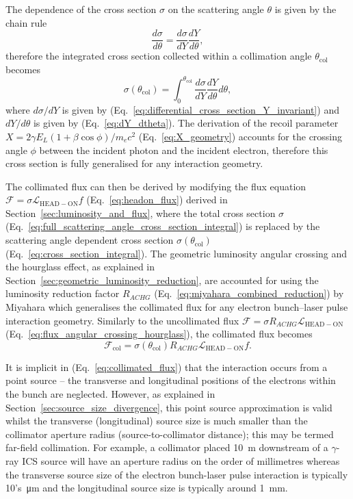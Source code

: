 \documentclass[../main.tex]{subfiles}
\begin{document}
The dependence of the cross section $\sigma$ on the scattering angle $\theta$ is given by the chain rule
\begin{equation}
\frac{d\sigma}{d\theta} = \frac{d\sigma}{dY}\frac{dY}{d\theta},
\label{eq:cross_section_chain_rule}
\end{equation}
therefore the integrated cross section collected within a collimation angle $\theta_{\mathrm{col}}$ becomes
\begin{equation}
\sigma\left(\theta_{\mathrm{col}}\right) = \int_{0}^{\theta_{\mathrm{col}}}\frac{d\sigma}{dY}\frac{dY}{d\theta}d\theta,
\label{eq:cross_section_integral}
\end{equation} 
where $d\sigma/dY$ is given by (Eq.~\ref{eq:differential_cross_section_Y_invariant}) and $dY/d\theta$ is given by (Eq.~\ref{eq:dY_dtheta}). The derivation of the recoil parameter $X = 2\gamma E_{L}\left(1+\beta\cos\phi\right)/m_{e}c^{2}$ (Eq.~\ref{eq:X_geometry}) accounts for the crossing angle $\phi$ between the incident photon and the incident electron, therefore this cross section is fully generalised for any interaction geometry.

The collimated flux can then be derived by modifying the flux equation $\mathcal{F} = \sigma\mathcal{L}_{\mathrm{HEAD-ON}}f$ (Eq.~\ref{eq:headon_flux}) derived in Section~\ref{sec:luminosity_and_flux}, where the total cross section $\sigma$ (Eq.~\ref{eq:full_scattering_angle_cross_section_integral}) is replaced by the scattering angle dependent cross section $\sigma\left(\theta_{\mathrm{col}}\right)$ (Eq.~\ref{eq:cross_section_integral}). The geometric luminosity angular crossing and the hourglass effect, as explained in Section~\ref{sec:geometric_luminosity_reduction}, are accounted for using the luminosity reduction factor $R_{ACHG}$ (Eq.~\ref{eq:miyahara_combined_reduction}) by Miyahara \cite{miyahara2008luminosity} which generalises the collimated flux for any electron bunch--laser pulse interaction geometry. Similarly to  the uncollimated flux $\mathcal{F} = \sigma R_{ACHG}\mathcal{L}_{\mathrm{HEAD-ON}}$ (Eq.~\ref{eq:flux_angular_crossing_hourglass}), the collimated flux becomes
\begin{equation}
\mathcal{F}_{\mathrm{col}} = \sigma\left(\theta_{\mathrm{col}}\right) R_{ACHG}\mathcal{L}_{\mathrm{HEAD-ON}}f.
\label{eq:collimated_flux}
\end{equation}

It is implicit in (Eq.~\ref{eq:collimated_flux}) that the interaction occurs from a point source -- the transverse and longitudinal positions of the electrons within the bunch are neglected. However, as explained in Section~\ref{sec:source_size_divergence}, this point source approximation is valid whilst the transverse (longitudinal) source size is much smaller than the collimator aperture radius (source-to-collimator distance); this may be termed far-field collimation. For example, a collimator placed 10~\si{\meter} downstream of a $\gamma$-ray ICS source will have an aperture radius on the order of millimetres whereas the transverse source size of the electron bunch-laser pulse interaction is typically 10's~\si{\micro\meter} and the longitudinal source size is typically around 1~\si{\milli\meter}. 
\end{document}

